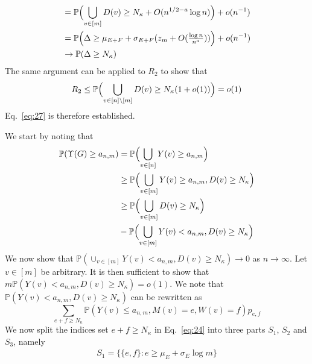 \documentclass[final]{IEEEtran}
\theoremstyle{definition}
\begin{document}
\begin{IEEEproof}
\begin{IEEEproof}[Eq.~\eqref{eq:27}]
\begin{equation}
\begin{split}
    & = \mathbb{P}\Bigl(\bigcup_{v \in [m]} D(v) \geq N_\kappa +
    O(n^{1/2 - a} \log{n})\Bigr) + o(n^{-1}) \\
    &= \mathbb{P}\Bigl(\Delta \geq \mu_{E+F} +
    \sigma_{E+F}(z_m + O(\tfrac{\log{n}}{n^{a}}))\Bigr) + o(n^{-1}) \\ 
    & \rightarrow \mathbb{P}(\Delta \geq N_{\kappa})
    \end{split}
\end{equation}
The same argument can be applied to $R_2$ to show that
\begin{equation}
  \label{eq:38}
  R_2 \leq \mathbb{P}\Bigl(\bigcup_{v \in [n] \setminus [m]} D(v) \geq
  N_{\kappa}(1 + o(1))\Bigr) = o(1)
\end{equation}
Eq.~\eqref{eq:27} is therefore established.
\end{IEEEproof}
\begin{IEEEproof}[Eq.~\eqref{eq:30}]
  We start by noting that
  \begin{equation*}
    \begin{split}
      \mathbb{P}(\Upsilon(G) \geq a_{n,m}) &=
      \mathbb{P}\Bigl(\bigcup_{v \in [n]}Y(v) \geq
      a_{n,m}\Bigr) \\
      & \geq \mathbb{P}\Bigl(\bigcup_{v \in [m]}Y(v) \geq
      a_{n,m}, D(v) \geq N_\kappa \Bigr) \\
      & \geq \mathbb{P}\Bigl(\bigcup_{v \in [m]} D(v) \geq
      N_\kappa\Bigr) \\ &- \mathbb{P}\Bigl( \bigcup_{v
        \in [m]} Y(v) < a_{n,m}, D(v) \geq N_\kappa\Bigr)
    \end{split}
  \end{equation*}
  We now show that $\mathbb{P}( \cup_{v
        \in [m]} Y(v) < a_{n,m}, D(v) \geq N_\kappa) \rightarrow 0$ as
      $n \rightarrow \infty$. Let $v \in [m]$ be arbitrary. It is then
      sufficient to show that $m\mathbb{P}(Y(v) < a_{n,m}, D(v) \geq
      N_{\kappa}) = o(1)$. We note that $\mathbb{P}(Y(v) < a_{n,m}, D(v) \geq
      N_{\kappa})$ can be rewritten as
      \begin{equation}
        \label{eq:24}
        \sum_{e + f \geq N_{\kappa}}{\mathbb{P}(Y(v) \leq a_{n,m}, M(v) = e, W(v) =
          f)}p_{e,f}
      \end{equation}
We now split the indices set $e + f \geq N_{\kappa}$ in
Eq.~\eqref{eq:24} into three parts $S_1$, $S_2$ and $S_3$, namely
\begin{gather}
  \label{eq:32}
    S_1 = \{ \{e,f\}\colon e \geq
        \mu_E + \sigma_E \log{m}\} \\

\end{gather}
\end{IEEEproof}
\end{IEEEproof}
\end{document}
